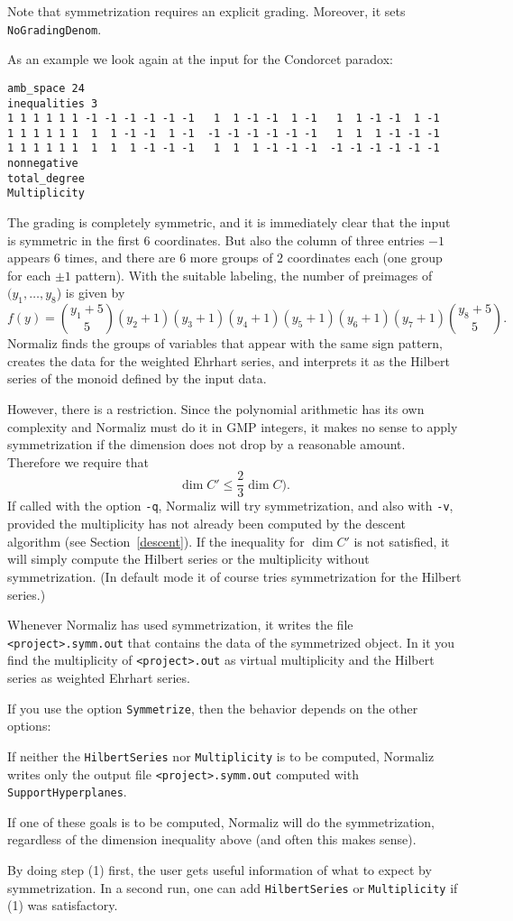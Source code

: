 Note that symmetrization requires an explicit grading. Moreover, it sets \verb|NoGradingDenom|.

As an example we look again at the input for the Condorcet paradox:
\begin{Verbatim}
amb_space 24
inequalities 3
1 1 1 1 1 1 -1 -1 -1 -1 -1 -1   1  1 -1 -1  1 -1   1  1 -1 -1  1 -1
1 1 1 1 1 1  1  1 -1 -1  1 -1  -1 -1 -1 -1 -1 -1   1  1  1 -1 -1 -1
1 1 1 1 1 1  1  1  1 -1 -1 -1   1  1  1 -1 -1 -1  -1 -1 -1 -1 -1 -1
nonnegative
total_degree
Multiplicity
\end{Verbatim}
The grading is completely symmetric, and it is immediately clear that the input is symmetric in the first $6$ coordinates. But also the column of three entries $-1$ appears $6$ times, and there are $6$ more groups of $2$ coordinates each (one group for each $\pm1$ pattern). With the suitable labeling, the number of preimages of$(y_1,\dots,y_8$) is given by
$$
f(y)=\binom{y_1+5}{5}(y_2+1)(y_3+1)(y_4+1)(y_5+1)(y_6+1)(y_7+1)\binom{y_8+5}{5}.
$$
Normaliz finds the groups of variables that appear with the same sign pattern, creates the data for the weighted Ehrhart series, and interprets it as the Hilbert series of the monoid defined by the input data.

However, there is a restriction. Since the polynomial arithmetic has its own complexity and Normaliz must do it in GMP integers, it makes no sense to apply symmetrization if the dimension does not drop by a reasonable amount. Therefore we require that
$$
\dim C' \le \frac{2}{3}\dim C).
$$
If called with the option \verb|-q|, Normaliz will try symmetrization, and also with \verb|-v|, provided the multiplicity has not already been computed by the descent algorithm (see Section~\ref{descent}). If the inequality for $\dim C'$ is not satisfied, it will simply compute the Hilbert series or the multiplicity without symmetrization. (In default mode it of course tries symmetrization for the Hilbert series.)

Whenever Normaliz has used symmetrization, it writes the file \verb|<project>.symm.out| that contains the data of the symmetrized object. In it you find the multiplicity of \verb|<project>.out| as virtual multiplicity and the Hilbert series as weighted Ehrhart series.

If you use the option \verb|Symmetrize|, then the behavior depends on the other options:
\begin{arab}
	\item If neither the \verb|HilbertSeries| nor \verb|Multiplicity| is to be computed, Normaliz writes only the output file \verb|<project>.symm.out| computed with \verb|SupportHyperplanes|.
	\item If one of these goals is to be computed, Normaliz will do the symmetrization, regardless of the dimension inequality above (and often this makes sense).
\end{arab}
By doing step (1) first, the user gets useful information of what to expect by symmetrization. In a second run, one can add \verb|HilbertSeries| or \verb|Multiplicity| if (1) was satisfactory.

